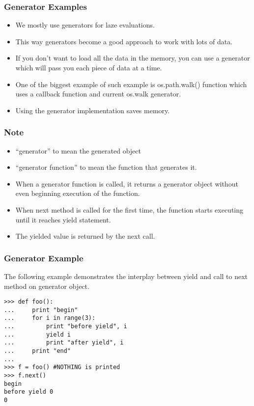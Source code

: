 \begin{frame}[fragile]\frametitle{Generator Examples}
    \begin{itemize}
    \item  We mostly use generators for laze evaluations. 
    \item This way generators become a good approach to work with lots of data. 
    \item If you don't want to load all the data in the memory, you can use a generator which will pass you each piece of data at a time.
\item One of the biggest example of such example is os.path.walk() function which uses a callback function and current os.walk generator. 
\item Using the generator implementation saves memory.
    \end{itemize}
\end{frame}

\begin{frame}[fragile]\frametitle{Note}
    \begin{itemize}
    \item  ``generator'' to mean the generated object 
    \item ``generator function'' to mean the function that generates it.
    \item  When a generator function is called, it returns a generator object without even beginning execution of the function.
    \item When next method is called for the first time, the function starts executing until it reaches yield statement. 
    \item The yielded value is returned by the next call.
    \end{itemize}
\end{frame}

\begin{frame}[fragile]\frametitle{Generator Example}
The following example demonstrates the interplay between yield and call to next method on generator object.
\begin{lstlisting}
>>> def foo():
...     print "begin"
...     for i in range(3):
...         print "before yield", i
...         yield i
...         print "after yield", i
...     print "end"
...
>>> f = foo() #NOTHING is printed
>>> f.next()
begin
before yield 0
0
\end{lstlisting}
\end{frame}

